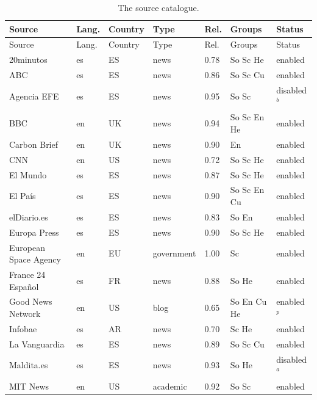 {\small
\begin{longtable}{@{}lllllll@{}}
\caption{The source catalogue.}
\label{tab:source-catalogue} \\
\toprule
Source & Lang. & Country & Type & Rel. & Groups & Status \\
\midrule
\endfirsthead
\toprule
Source & Lang. & Country & Type & Rel. & Groups & Status \\
\midrule
\endhead
\bottomrule
\endfoot
20minutos                  & es & ES  & news       & 0.78 & So Sc He     & enabled \\
ABC                        & es & ES  & news       & 0.86 & So Sc Cu     & enabled \\
Agencia EFE                & es & ES  & news       & 0.95 & So Sc        & disabled$^{b}$ \\
BBC                        & en & UK  & news       & 0.94 & So Sc En He  & enabled \\
Carbon Brief               & en & UK  & news       & 0.90 & En           & enabled \\
CNN                        & en & US  & news       & 0.72 & So Sc He     & enabled \\
El Mundo                   & es & ES  & news       & 0.87 & So Sc He     & enabled \\
El País                    & es & ES  & news       & 0.90 & So Sc En Cu  & enabled \\
elDiario.es                & es & ES  & news       & 0.83 & So En        & enabled \\
Europa Press               & es & ES  & news       & 0.90 & So Sc He     & enabled \\
European Space Agency      & en & EU  & government & 1.00 & Sc           & enabled \\
France 24 Español          & es & FR  & news       & 0.88 & So He        & enabled \\
Good News Network          & en & US  & blog       & 0.65 & So En Cu He  & enabled$^{p}$ \\
Infobae                    & es & AR  & news       & 0.70 & Sc He        & enabled \\
La Vanguardia              & es & ES  & news       & 0.89 & So Sc Cu     & enabled \\
Maldita.es                 & es & ES  & news       & 0.93 & So He        & disabled$^{a}$ \\
MIT News                   & en & US  & academic   & 0.92 & So Sc        & enabled \\

\end{longtable}}

